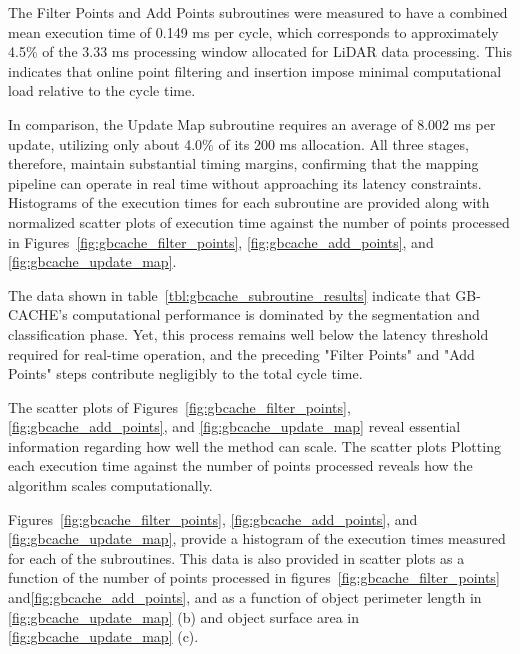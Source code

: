 \documentclass{erauthesis}
\begin{document}
The Filter Points and Add Points subroutines were measured to have a combined mean execution time of  0.149 ms per cycle, which corresponds to approximately 4.5\% of the 3.33 ms processing window allocated for LiDAR data processing. 
This indicates that online point filtering and insertion impose minimal computational load relative to the cycle time.

In comparison, the Update Map subroutine requires an average of 8.002 ms per update, utilizing only about 4.0\% of its 200 ms allocation. 
All three stages, therefore, maintain substantial timing margins, confirming that the mapping pipeline can operate in real time without approaching its latency constraints. 
Histograms of the execution times for each subroutine are provided along with normalized scatter plots of execution time against the number of points processed in Figures~\ref{fig:gbcache_filter_points}, \ref{fig:gbcache_add_points}, and \ref{fig:gbcache_update_map}.

The data shown in table~\ref{tbl:gbcache_subroutine_results} indicate that GB-CACHE's computational performance is dominated by the segmentation and classification phase. 
Yet, this process remains well below the latency threshold required for real-time operation, and the preceding "Filter Points" and "Add Points" steps contribute negligibly to the total cycle time. 


The scatter plots of Figures~\ref{fig:gbcache_filter_points}, \ref{fig:gbcache_add_points}, and \ref{fig:gbcache_update_map} reveal essential information regarding how well the method can scale. 
The scatter plots 
Plotting each execution time against the number of points processed reveals how the algorithm scales computationally. 

Figures~\ref{fig:gbcache_filter_points}, \ref{fig:gbcache_add_points}, and \ref{fig:gbcache_update_map}, provide a histogram of the execution times measured for each of the subroutines. This data is also provided in scatter plots as a function of the number of points processed in figures~\ref{fig:gbcache_filter_points} and\ref{fig:gbcache_add_points}, and as a function of object perimeter length in \ref{fig:gbcache_update_map} (b) and object surface area in \ref{fig:gbcache_update_map} (c).
\end{document}
